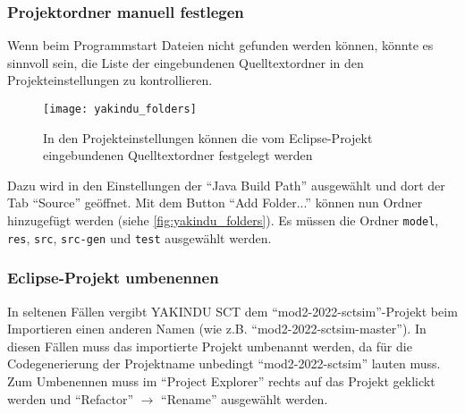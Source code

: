 \subsubsection{Projektordner manuell festlegen}

Wenn beim Programmstart Dateien nicht gefunden werden können, könnte es sinnvoll sein, die Liste der eingebundenen Quelltextordner in den Projekteinstellungen zu kontrollieren.


\begin{figure}
	\centering
	\texttt{[image: yakindu\_folders]}
	\caption{In den Projekteinstellungen können die vom Eclipse-Projekt eingebundenen Quelltextordner festgelegt werden}
	\label{fig:yakindu_folders}
\end{figure}

Dazu wird in den Einstellungen der \enquote{Java Build Path} ausgewählt und dort der Tab \enquote{Source} geöffnet. 
Mit dem Button \enquote{Add Folder...} können nun Ordner hinzugefügt werden  (siehe \autoref{fig:yakindu_folders}).
Es müssen die Ordner \texttt{model}, \texttt{res}, \texttt{src}, \texttt{src-gen} und \texttt{test} ausgewählt werden.

\enlargethispage{1\baselineskip}


\subsubsection{Eclipse-Projekt umbenennen} 

In seltenen Fällen vergibt YAKINDU SCT dem \enquote{mod2-2022-sctsim}-Projekt beim Importieren einen anderen Namen (wie z.B. \enquote{mod2-2022-sctsim-master}).
In diesen Fällen muss das importierte Projekt umbenannt werden, da für die Codegenerierung der Projektname unbedingt \enquote{mod2-2022-sctsim} lauten muss. 
Zum Umbenennen muss im \enquote{Project Explorer} rechts auf das Projekt geklickt werden und \enquote{Refactor} $\rightarrow$ \enquote{Rename} ausgewählt werden.

